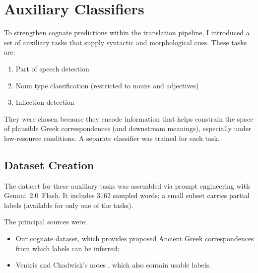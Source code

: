 \chapter{Auxiliary Classifiers} \label{chap:classifiers}
To strengthen cognate predictions within the translation pipeline, I introduced a set of auxiliary tasks that supply syntactic and morphological cues. These tasks are:
\begin{enumerate}
    \item Part of speech detection
    \item Noun type classification (restricted to nouns and adjectives)
    \item Inflection detection
\end{enumerate}
They were chosen because they encode information that helps constrain the space of plausible Greek correspondences (and downstream meanings), especially under low-resource conditions. A separate classifier was trained for each task.

\section{Dataset Creation} \label{sec:aux-dataset}
The dataset for these auxiliary tasks was assembled via prompt engineering with Gemini~2.0~Flash. It includes 3162 sampled words; a small subset carries partial labels (available for only one of the tasks).

The principal sources were:
\begin{itemize}
    \item Our cognate dataset, which provides proposed Ancient Greek correspondences from which labels can be inferred;
    \item Ventris and Chadwick's notes \cite{chadwick-notes}, which also contain usable labels.
\end{itemize}

